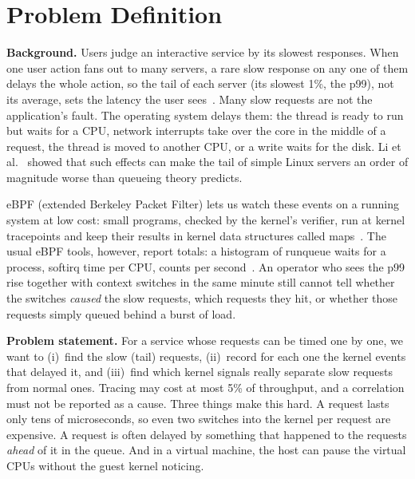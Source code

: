 \section{Problem Definition}
\label{sec:intro}

\textbf{Background.} Users judge an interactive service by its slowest responses.
When one user action fans out to many servers, a rare slow response on any
one of them delays the whole action, so the tail of each server (its slowest
1\%, the p99), not its average, sets the latency the user
sees~\cite{dean2013tail}. Many slow requests are not the application's
fault. The operating system delays them: the thread is ready to run but
waits for a CPU, network interrupts take over the core in the middle of a
request, the thread is moved to another CPU, or a write waits for the disk.
Li et al.~\cite{li2014tales} showed that such effects can make the tail of
simple Linux servers an order of magnitude worse than queueing theory
predicts.

eBPF (extended Berkeley Packet Filter) lets us watch these events on a
running system at low cost: small programs, checked by the kernel's verifier, run at kernel tracepoints and
keep their results in kernel data structures called
maps~\cite{kernelbpf}. The usual eBPF tools, however, report totals: a
histogram of runqueue waits for a process, softirq time per CPU, counts per
second~\cite{bcc}. An operator who sees the p99 rise together with context
switches in the same minute still cannot tell whether the switches
\emph{caused} the slow requests, which requests they hit, or whether those
requests simply queued behind a burst of load.

\textbf{Problem statement.} For a service whose requests can be timed one by one, we
want to (i)~find the slow (tail) requests, (ii)~record for each one the
kernel events that delayed it, and (iii)~find which kernel signals really
separate slow requests from normal ones. Tracing may cost at most 5\% of
throughput, and a correlation must not be reported as a cause. Three things
make this hard. A request lasts only tens of microseconds, so even two
switches into the kernel per request are expensive. A request is often
delayed by something that happened to the requests \emph{ahead} of it in
the queue. And in a virtual machine, the host can pause the virtual CPUs
without the guest kernel noticing.

